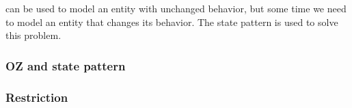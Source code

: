 \oz{} can be used to model an entity with unchanged behavior, but some time we need to model an entity that changes its behavior. The state pattern is used to solve this problem.
\subsubsection{OZ and state pattern}


\subsubsection{Restriction}
